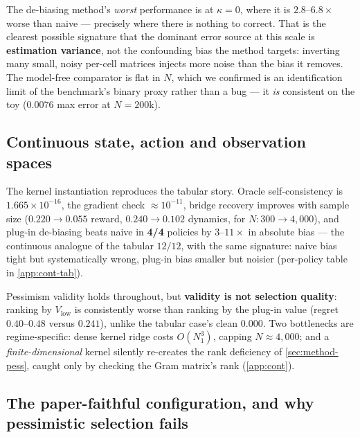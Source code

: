 \documentclass{article}
\theoremstyle{plain}
\theoremstyle{definition}
\begin{document}
The de-biasing method's \emph{worst} performance is at $\kappa = 0$, where it is
$2.8$--$6.8\times$ worse than naive --- precisely where there is nothing to
correct. That is the clearest possible signature that the dominant error source
at this scale is \textbf{estimation variance}, not the confounding bias the
method targets: inverting many small, noisy per-cell matrices injects more noise
than the bias it removes. The model-free comparator is flat in $N$, which we
confirmed is an identification limit of the benchmark's binary proxy rather than
a bug --- it \emph{is} consistent on the toy ($0.0076$ max error at
$N{=}200\mathrm{k}$).

\subsection{Continuous state, action and observation spaces}
\label{sec:exp-cont}
The kernel instantiation reproduces the tabular story. Oracle self-consistency is
$1.665\times10^{-16}$, the gradient check $\approx\!10^{-11}$, bridge recovery
improves with sample size ($0.220 \to 0.055$ reward, $0.240 \to 0.102$ dynamics,
for $N: 300 \to 4{,}000$), and plug-in de-biasing beats naive in \textbf{4/4}
policies by $3$--$11\times$ in absolute bias --- the continuous analogue of the
tabular $12/12$, with the same signature: naive bias tight but systematically
wrong, plug-in bias smaller but noisier (per-policy table in
\cref{app:cont-tab}).

Pessimism validity holds throughout, but \textbf{validity is not selection
quality}: ranking by $V_{\mathrm{low}}$ is consistently worse than ranking by the
plug-in value (regret $0.40$--$0.48$ versus $0.241$), unlike the tabular case's
clean $0.000$. Two bottlenecks are regime-specific: dense kernel ridge costs
$O(N_1^3)$, capping $N \approx 4{,}000$; and a \emph{finite-dimensional} kernel
silently re-creates the rank deficiency of \cref{sec:method-pess}, caught only by
checking the Gram matrix's rank (\cref{app:cont}).

\subsection{The paper-faithful configuration, and why pessimistic selection fails}
\label{sec:exp-fa}
\end{document}

